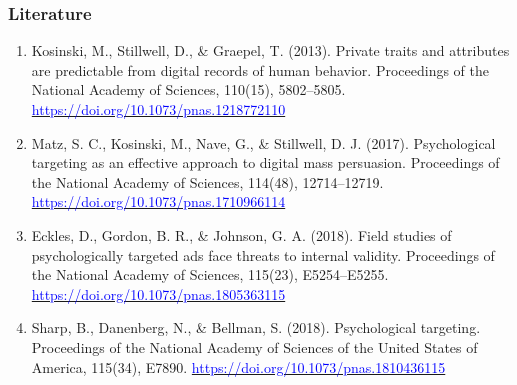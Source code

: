 \documentclass[aspectratio=169]{beamer}
\begin{document}
\begin{frame}
    \frametitle{Literature}
    \scriptsize
    \begin{enumerate}
        \item Kosinski, M., Stillwell, D., \& Graepel, T. (2013). Private traits and attributes are predictable from digital records of human behavior. Proceedings of the National Academy of Sciences, 110(15), 5802–5805. \href{https://doi.org/10.1073/pnas.1218772110}{\textcolor{blue}{https://doi.org/10.1073/pnas.1218772110}}
        \item Matz, S. C., Kosinski, M., Nave, G., \& Stillwell, D. J. (2017). Psychological targeting as an effective approach to digital mass persuasion. Proceedings of the National Academy of Sciences, 114(48), 12714–12719. \href{https://doi.org/10.1073/pnas.1710966114}{\textcolor{blue}{https://doi.org/10.1073/pnas.1710966114}}
        \item Eckles, D., Gordon, B. R., \& Johnson, G. A. (2018). Field studies of psychologically targeted ads face threats to internal validity. Proceedings of the National Academy of Sciences, 115(23), E5254–E5255. \href{https://doi.org/10.1073/pnas.1805363115}{\textcolor{blue}{https://doi.org/10.1073/pnas.1805363115}}
        \item Sharp, B., Danenberg, N., \& Bellman, S. (2018). Psychological targeting. Proceedings of the National Academy of Sciences of the United States of America, 115(34), E7890. \href{https://doi.org/10.1073/pnas.1810436115}{\textcolor{blue}{https://doi.org/10.1073/pnas.1810436115}}
    \end{enumerate}
\end{frame}
\end{document}

